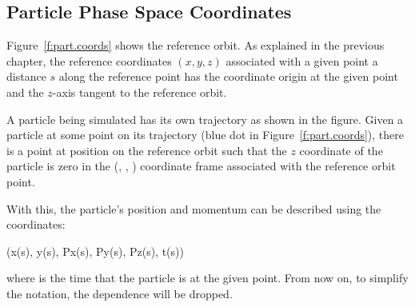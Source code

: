 \documentclass{hitec}     %
\begin{document}
\subsection{Particle Phase Space Coordinates}
\label{s:phase.space.sub}

Figure~\ref{f:part.coords} shows the reference orbit. As explained in the previous chapter, the
reference coordinates $(x, y, z)$ associated with a given point a distance $s$ along the reference
point has the coordinate origin at the given point and the $z$-axis tangent to the reference orbit.

A particle being simulated has its own trajectory as shown in the figure. Given a particle at some
point on its trajectory (blue dot in Figure~\ref{f:part.coords}), there is a point at position
 on the reference orbit such that the $z$ coordinate of the particle is zero in the (,
, ) coordinate frame associated with the reference orbit point.

With this, the particle's position and momentum  can be described using the coordinates:
\begin{code}
    (x(s), y(s), Px(s), Py(s), Pz(s), t(s))
\end{code}
where  is the time that the particle is at the given point. From now on, to simplify the
notation, the  dependence will be dropped.
\end{document}
